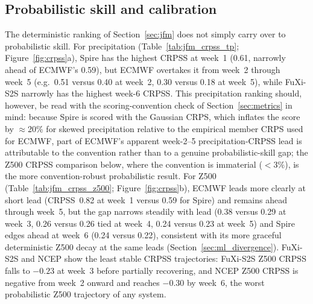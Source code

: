 \documentclass[11pt,a4paper]{article}
\begin{document}
\subsection{Probabilistic skill and calibration}\label{sec:prob}

The deterministic ranking of Section~\ref{sec:jfm} does not simply carry over
to probabilistic skill. For precipitation (Table~\ref{tab:jfm_crpss_tp};
Figure~\ref{fig:crpss}a),
Spire has the highest CRPSS at week~1 (0.61, narrowly ahead of ECMWF's 0.59),
but ECMWF overtakes it from week~2 through week~5 (e.g.\ 0.51 versus 0.40 at
week~2, 0.30 versus 0.18 at week~5), while FuXi-S2S narrowly has the highest
week-6 CRPSS. This precipitation ranking should, however, be read with the
scoring-convention check of Section~\ref{sec:metrics} in mind: because Spire is
scored with the Gaussian CRPS, which inflates the score by $\approx$20\% for
skewed precipitation relative to the empirical member CRPS used for ECMWF, part
of ECMWF's apparent week-2--5 precipitation-CRPSS lead is attributable to the
convention rather than to a genuine probabilistic-skill gap; the Z500 CRPSS
comparison below, where the convention is immaterial ($<3\%$), is the more
convention-robust probabilistic result. For Z500
(Table~\ref{tab:jfm_crpss_z500}; Figure~\ref{fig:crpss}b), ECMWF leads more clearly
at short lead (CRPSS~0.82 at week~1 versus 0.59 for Spire) and remains ahead
through week~5, but the gap narrows steadily with lead (0.38 versus 0.29 at
week~3, 0.26 versus 0.26 tied at week~4, 0.24 versus 0.23 at week~5) and Spire
edges ahead at week~6 (0.24 versus 0.22), consistent with its more graceful
deterministic Z500 decay at the same leads (Section~\ref{sec:ml_divergence}).
FuXi-S2S and NCEP show the least stable CRPSS trajectories: FuXi-S2S Z500
CRPSS falls to $-0.23$ at week~3 before partially recovering, and NCEP Z500
CRPSS is negative from week~2 onward and reaches $-0.30$ by week~6, the worst
probabilistic Z500 trajectory of any system.
\end{document}
